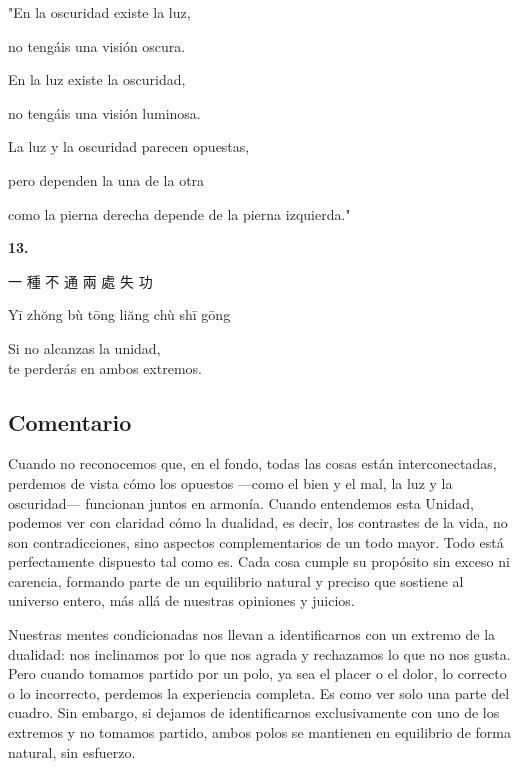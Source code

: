 \documentclass[
  a5paperpaper,
]{article}
\begin{document}
"En la oscuridad existe la luz,

no tengáis una visión oscura.

En la luz existe la oscuridad,

no tengáis una visión luminosa.

La luz y la oscuridad parecen opuestas,

pero dependen la una de la otra

como la pierna derecha depende de la pierna izquierda."

\hfill\break

\hypertarget{03}{}
\begin{verseblock}

\newpage

\begin{center}\textbf{13.}\end{center}

一 種 不 通 兩 處 失 功

Yī zhŏng bù tōng liăng chù shī gōng

Si no alcanzas la unidad,\\
te perderás en ambos extremos.

\end{verseblock}

\hfill\break

\hypertarget{comentario-12}{%
\subsection{Comentario}\label{comentario-12}}

Cuando no reconocemos que, en el fondo, todas las cosas están
interconectadas, perdemos de vista cómo los opuestos ---como el bien y
el mal, la luz y la oscuridad--- funcionan juntos en armonía. Cuando
entendemos esta Unidad, podemos ver con claridad cómo la dualidad, es
decir, los contrastes de la vida, no son contradicciones, sino aspectos
complementarios de un todo mayor. Todo está perfectamente dispuesto tal
como es. Cada cosa cumple su propósito sin exceso ni carencia, formando
parte de un equilibrio natural y preciso que sostiene al universo
entero, más allá de nuestras opiniones y juicios.

Nuestras mentes condicionadas nos llevan a identificarnos con un extremo
de la dualidad: nos inclinamos por lo que nos agrada y rechazamos lo que
no nos gusta. Pero cuando tomamos partido por un polo, ya sea el placer
o el dolor, lo correcto o lo incorrecto, perdemos la experiencia
completa. Es como ver solo una parte del cuadro. Sin embargo, si dejamos
de identificarnos exclusivamente con uno de los extremos y no tomamos
partido, ambos polos se mantienen en equilibrio de forma natural, sin
esfuerzo.
\end{document}
